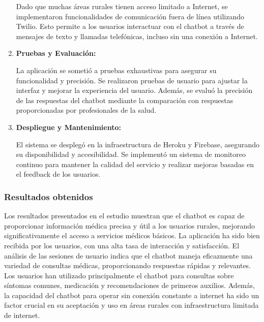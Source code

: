 \begin{enumerate}
			\subitem Dado que muchas áreas rurales tienen acceso limitado a Internet, se implementaron funcionalidades de comunicación fuera de línea utilizando Twilio. Esto permite a los usuarios interactuar con el chatbot a través de mensajes de texto y llamadas telefónicas, incluso sin una conexión a Internet.
		
		\item \textbf{Pruebas y Evaluación:}
		
			\subitem La aplicación se sometió a pruebas exhaustivas para asegurar su funcionalidad y precisión. Se realizaron pruebas de usuario para ajustar la interfaz y mejorar la experiencia del usuario. Además, se evaluó la precisión de las respuestas del chatbot mediante la comparación con respuestas proporcionadas por profesionales de la salud.
	
		\item \textbf{Despliegue y Mantenimiento:}
		
			\subitem El sistema se desplegó en la infraestructura de Heroku y Firebase, asegurando su disponibilidad y accesibilidad. Se implementó un sistema de monitoreo continuo para mantener la calidad del servicio y realizar mejoras basadas en el feedback de los usuarios.
		
		\end{enumerate}

	\subsubsection{Resultados obtenidos}
		Los resultados presentados en el estudio muestran que el chatbot es capaz de proporcionar información médica precisa y útil a los usuarios rurales, mejorando significativamente el acceso a servicios médicos básicos. La aplicación ha sido bien recibida por los usuarios, con una alta tasa de interacción y satisfacción. El análisis de las sesiones de usuario indica que el chatbot maneja eficazmente una variedad de consultas médicas, proporcionando respuestas rápidas y relevantes. Los usuarios han utilizado principalmente el chatbot para consultas sobre síntomas comunes, medicación y recomendaciones de primeros auxilios. Además, la capacidad del chatbot para operar sin conexión constante a internet ha sido un factor crucial en su aceptación y uso en áreas rurales con infraestructura limitada de internet.

